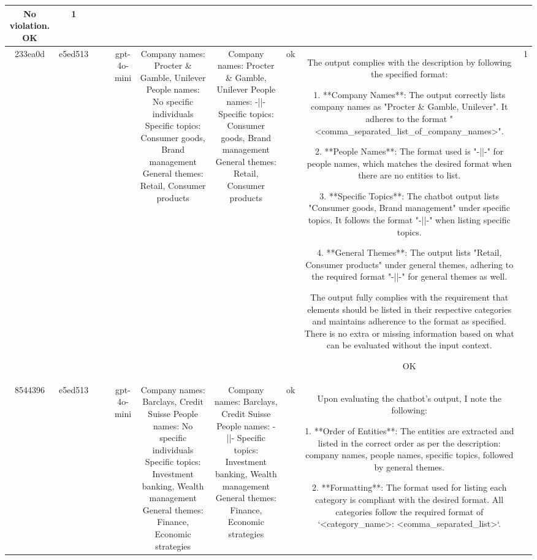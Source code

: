 \begin{table}[h!]
\begin{tabular}{|c|c|c|c|c|c|c|c|c|c|}
No violation.
OK & 1\\
\hline
233ea0d & e5ed513 &  &  & gpt-4o-mini & Company names: Procter \& Gamble, Unilever
People names: No specific individuals
Specific topics: Consumer goods, Brand management
General themes: Retail, Consumer products & Company names: Procter \& Gamble, Unilever  
People names: -||-  
Specific topics: Consumer goods, Brand management  
General themes: Retail, Consumer products & ok & The output complies with the description by following the specified format:

1. **Company Names**: The output correctly lists company names as "Procter \& Gamble, Unilever". It adheres to the format "<comma_separated_list_of_company_names>".

2. **People Names**: The format used is "-||-" for people names, which matches the desired format when there are no entities to list.

3. **Specific Topics**: The chatbot output lists "Consumer goods, Brand management" under specific topics. It follows the format "-||-" when listing specific topics.

4. **General Themes**: The output lists "Retail, Consumer products" under general themes, adhering to the required format "-||-" for general themes as well.

The output fully complies with the requirement that elements should be listed in their respective categories and maintains adherence to the format as specified. There is no extra or missing information based on what can be evaluated without the input context.

OK & 1\\
\hline
8544396 & e5ed513 &  &  & gpt-4o-mini & Company names: Barclays, Credit Suisse
People names: No specific individuals
Specific topics: Investment banking, Wealth management
General themes: Finance, Economic strategies & Company names: Barclays, Credit Suisse  
People names: -||-  
Specific topics: Investment banking, Wealth management  
General themes: Finance, Economic strategies   & ok & Upon evaluating the chatbot's output, I note the following:

1. **Order of Entities**: The entities are extracted and listed in the correct order as per the description: company names, people names, specific topics, followed by general themes.

2. **Formatting**: The format used for listing each category is compliant with the desired format. All categories follow the required format of `<category_name>: <comma_separated_list>`.


\end{tabular}
\end{table}
